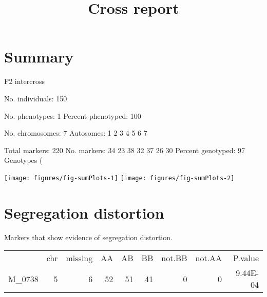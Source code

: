 \documentclass[a4paper,11pt]{article}\usepackage[]{graphicx}\usepackage[]{color}
\title{Cross report}%
\author{\vspace{-5ex}}
\date{\vspace{-5ex}}
\makeatletter
\def\maxwidth{ %
  \ifdim\Gin@nat@width>\linewidth
    \linewidth
  \else
    \Gin@nat@width
  \fi
}
\newenvironment{knitrout}{}{} %
\makeatother
\begin{document}


\maketitle
\singlespacing

\section{Summary}

    F2 intercross

    No. individuals:    150 

    No. phenotypes:     1 
    Percent phenotyped: 100 

    No. chromosomes:    7 
        Autosomes:      1 2 3 4 5 6 7 

    Total markers:      220 
    No. markers:        34 23 38 32 37 26 30 
    Percent genotyped:  97 
    Genotypes (%

\begin{knitrout}
\color{fgcolor}

{\centering \texttt{[image: figures/fig-sumPlots-1]} 
\texttt{[image: figures/fig-sumPlots-2]} 

}



\end{knitrout}

\section{Segregation distortion}

Markers that show evidence of segregation distortion.
\begin{table}[ht]
\begin{flushleft}
\begin{tabular}{lrrrrrrrr}
  & chr & missing & AA & AB & BB & not.BB & not.AA & P.value \\ 
 M\_0738 & 5 & 6 & 52 & 51 & 41 & 0 & 0 & 9.44E-04 \\ 
  \end{tabular}
\label{segrDist}
\end{flushleft}
\end{table}
\end{document}

